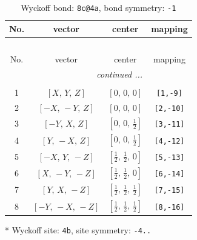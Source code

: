 \documentclass[fleqn,8pt]{jsarticle}
\begin{document}
\begin{longtable}{cccc}
\caption{Wyckoff bond: {\tt 8c@4a}, bond symmetry: {\tt -1}}
 \\
 \hline \hline
No. & vector & center & mapping \\ \hline \endfirsthead

\multicolumn{3}{l}{\tablename\ \thetable{}} \\
 \hline \hline
No. & vector & center & mapping \\ \hline \endhead

 \hline \hline
\multicolumn{3}{r}{\footnotesize\it continued ...} \\ \endfoot

 \hline \hline
\multicolumn{3}{r}{} \\ \endlastfoot

1 & $\left[ X,\, Y,\, Z \right]$ & $\left[ 0,\, 0,\, 0 \right]$ & {\tt [1,-9]} \\ \hline
2 & $\left[ - X,\, - Y,\, Z \right]$ & $\left[ 0,\, 0,\, 0 \right]$ & {\tt [2,-10]} \\ \hline
3 & $\left[ - Y,\, X,\, Z \right]$ & $\left[ 0,\, 0,\, \frac{1}{2} \right]$ & {\tt [3,-11]} \\ \hline
4 & $\left[ Y,\, - X,\, Z \right]$ & $\left[ 0,\, 0,\, \frac{1}{2} \right]$ & {\tt [4,-12]} \\ \hline
5 & $\left[ - X,\, Y,\, - Z \right]$ & $\left[ \frac{1}{2},\, \frac{1}{2},\, 0 \right]$ & {\tt [5,-13]} \\ \hline
6 & $\left[ X,\, - Y,\, - Z \right]$ & $\left[ \frac{1}{2},\, \frac{1}{2},\, 0 \right]$ & {\tt [6,-14]} \\ \hline
7 & $\left[ Y,\, X,\, - Z \right]$ & $\left[ \frac{1}{2},\, \frac{1}{2},\, \frac{1}{2} \right]$ & {\tt [7,-15]} \\ \hline
8 & $\left[ - Y,\, - X,\, - Z \right]$ & $\left[ \frac{1}{2},\, \frac{1}{2},\, \frac{1}{2} \right]$ & {\tt [8,-16]} \\
\end{longtable}
* Wyckoff site: {\tt 4b}, site symmetry: {\tt -4..}
\renewcommand{\arraystretch}{1.2}
\end{document}
